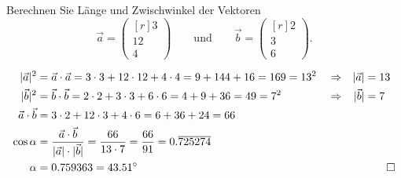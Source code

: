 Berechnen Sie Länge und Zwischwinkel der Vektoren
\[
\vec{a}
=
\begin{pmatrix*}[r] 3 \\ 12 \\ 4 \end{pmatrix*}
\qquad\text{und}\qquad
\vec{b}
=
\begin{pmatrix*}[r] 2 \\ 3 \\ 6 \end{pmatrix*}.
\]

\begin{loesung}
\begin{align*}
|\vec{a}|^2
&=
\vec{a}\cdot\vec{a}
=
3\cdot 3 + 12\cdot 12 + 4 \cdot 4
=
9 + 144 + 16
=
169
=
13^2
&&\Rightarrow&
|\vec{a}|
&=
13
\\
|\vec{b}|^2
&=
\vec{b}\cdot\vec{b}
=
2\cdot 2 + 3\cdot 3 + 6 \cdot 6
=
4 + 9 + 36
=
49
=
7^2
&&\Rightarrow&
|\vec{b}|
&=
7
\\
\vec{a}\cdot\vec{b}
&=
3\cdot 2 + 12 \cdot 3 + 4 \cdot 6
=
6 + 36 + 24
=
66
&&&&
\\
\cos\alpha
&=
\frac{\vec{a}\cdot\vec{b}}{|\vec{a}|\cdot|\vec{b}|}
=
\frac{66}{13\cdot 7}
=
\frac{66}{91}
=
0.\overline{725274}
&&&&
\\
\alpha
&=
0.759363
=
43.51^\circ
&&&&
\qedhere
\end{align*}
\end{loesung}
